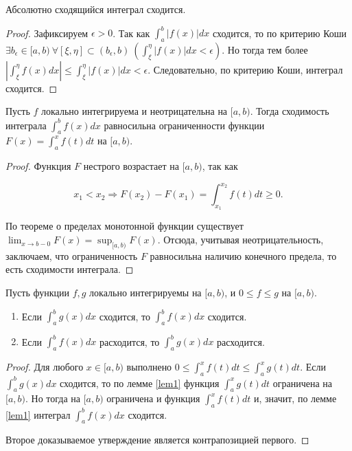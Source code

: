 \begin{corollary}
    Абсолютно сходящийся интеграл сходится.
\end{corollary}

\begin{proof}
    Зафиксируем $\epsilon > 0$. Так как $\int_{a}^{b} |f(x)| dx$ сходится, то по критерию Коши $\exists b_{\epsilon} \in [a, b) \ \forall [\xi, \eta] \subset (b_{\epsilon}, b) \ \left(\int_{\xi}^{\eta} |f(x)| dx < \epsilon\right)$. Но тогда тем более $\left|\int_{\xi}^{\eta} f(x) dx \right| \leq \int_{\xi}^{\eta} |f(x)| dx < \epsilon$. Следовательно, по критерию Коши, интеграл сходится.
\end{proof}

\begin{lemma}
    \label{lem1}
    Пусть $f$ локально интегрируема и неотрицательна на $[a, b)$. Тогда сходимость интеграла $\int_{a}^{b} f(x) dx$ равносильна ограниченности функции $F(x) = \int_{a}^{x} f(t) dt$ на $[a, b)$.
\end{lemma}

\begin{proof}
    Функция $F$ нестрого возрастает на $[a, b)$, так как
    
    \[
        x_{1} < x_{2} \Rightarrow F(x_{2}) - F(x_{1}) = \int_{x_{1}}^{x_{2}} f(t) dt \geq 0.
    \]
    
    По теореме о пределах монотонной функции существует $\lim_{x \to b - 0} F(x) = \sup_{[a, b)} F(x)$. Отсюда, учитывая неотрицательность, заключаем, что ограниченность $F$ равносильна наличию конечного предела, то есть сходимости интеграла.
\end{proof}

\begin{theorem}
    \label{compar_feat}
    Пусть функции $f, g$ локально интегрируемы на $[a, b)$, и $0 \leq f \leq g$ на $[a, b)$.
    \begin{enumerate}
        \item Если $\int_{a}^{b} g(x) dx$ сходится, то $\int_{a}^{b} f(x) dx$ сходится.
        \item Если $\int_{a}^{b} f(x) dx$ расходится, то $\int_{a}^{b} g(x) dx$ расходится.
    \end{enumerate}
\end{theorem}

\begin{proof}
     Для любого $x \in [a, b)$ выполнено $0 \leq \int_{a}^{x} f(t) dt \leq \int_{a}^{x} g(t) dt$. Если $\int_{a}^{b} g(x) dx$ сходится, то по лемме \ref{lem1} функция $\int_{a}^{x} g(t) dt$ ограничена на $[a, b)$. Но тогда на $[a, b)$ ограничена и функция $\int_{a}^{x} f(t) dt$ и, значит, по лемме \ref{lem1} интеграл $\int_{a}^{b} f(x) dx$ сходится.

     Второе доказываемое утверждение является контрапозицией первого.
\end{proof}

